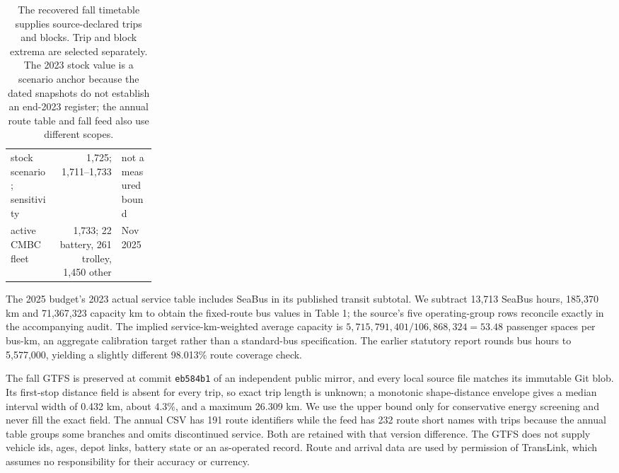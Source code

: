 \documentclass[12pt,letterpaper]{article}
\begin{document}
\begin{table}[htbp]
\begin{tabularx}{\linewidth}{@{}>{\raggedright\arraybackslash}X r >{\raggedright\arraybackslash}p{0.24\linewidth}@{}}
2023 stock scenario; sensitivity & 1,725; 1,711--1,733 & not a measured bound\cite{cmbcfleet2025}\\
2025 active CMBC fleet & 1,733; 22 battery, 261 trolley, 1,450 other & 18 Nov 2025\cite{cmbcfleet2025}\\
\bottomrule
\end{tabularx}
\caption{The recovered fall timetable supplies source-declared trips and blocks. Trip and block extrema are selected separately. The 2023 stock value is a scenario anchor because the dated snapshots do not establish an end-2023 register; the annual route table and fall feed also use different scopes.}
\end{table}

The 2025 budget's 2023 actual service table includes SeaBus in its published transit subtotal. We subtract 13,713 SeaBus hours, 185,370 km and 71,367,323 capacity km to obtain the fixed-route bus values in Table 1; the source's five operating-group rows reconcile exactly in the accompanying audit. The implied service-km-weighted average capacity is $5{,}715{,}791{,}401/106{,}868{,}324=53.48$ passenger spaces per bus-km, an aggregate calibration target rather than a standard-bus specification. The earlier statutory report rounds bus hours to 5,577,000, yielding a slightly different 98.013\% route coverage check.\cite{budget2025,statutory}

The fall GTFS is preserved at commit \texttt{eb584b1} of an independent public mirror, and every local source file matches its immutable Git blob. Its first-stop distance field is absent for every trip, so exact trip length is unknown; a monotonic shape-distance envelope gives a median interval width of 0.432 km, about 4.3\%, and a maximum 26.309 km. We use the upper bound only for conservative energy screening and never fill the exact field. The annual CSV has 191 route identifiers while the feed has 232 route short names with trips because the annual table groups some branches and omits discontinued service. Both are retained with that version difference. The GTFS does not supply vehicle ids, ages, depot links, battery state or an as-operated record. Route and arrival data are used by permission of TransLink, which assumes no responsibility for their accuracy or currency.\cite{gtfs2023}
\end{document}
